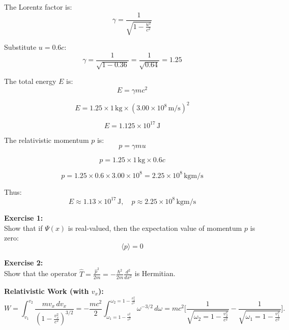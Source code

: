 \documentclass{article}
\begin{document}
\begin{multicols}{2}
\begin{minipage}{\linewidth}
The Lorentz factor is:
\[
\gamma = \frac{1}{\sqrt{1 - \frac{u^2}{c^2}}}
\]

Substitute \( u = 0.6c \):
\[
\gamma = \frac{1}{\sqrt{1 - 0.36}} = \frac{1}{\sqrt{0.64}} = 1.25
\]

The total energy \( E \) is:
\[
E = \gamma mc^2
\]

\[
E = 1.25 \times 1 \, \si{\kilogram} \times (3.00 \times 10^8 \, \si{\meter\per\second})^2
\]

\[
E = 1.125 \times 10^{17} \, \si{\joule}
\]

The relativistic momentum \( p \) is:
\[
p = \gamma mu
\]

\[
p = 1.25 \times 1 \, \si{\kilogram} \times 0.6c
\]

\[
p = 1.25 \times 0.6 \times 3.00 \times 10^8 = 2.25 \times 10^8 \, \si{\kilogram\meter\per\second}
\]

Thus:
\[
E \approx 1.13 \times 10^{17} \, \si{\joule}, \quad p \approx 2.25 \times 10^8 \, \si{\kilogram\meter\per\second}
\]

\end{minipage}

\vspace{0.2cm}

\begin{minipage}{\linewidth}
\textbf{Exercise 1:} \\[-0.2cm]
Show that if $\Psi(x)$ is real-valued, then the expectation value of momentum $p$ is zero:
\[
\langle p \rangle = 0
\]
\end{minipage}

\vspace{0.2cm}

\begin{minipage}{\linewidth}
\textbf{Exercise 2:} \\[-0.2cm]
Show that the operator $\hat{T} = \frac{\hat{p}^2}{2m} = -\frac{\hbar^2}{2m} \frac{d^2}{dx^2}$ is Hermitian.
\end{minipage}

\textbf{Relativistic Work (with $v_x$):} \\[-0.2cm]
\[
W = \int_{v_1}^{v_2} \frac{m v_x \, dv_x}{\left( 1 - \frac{v_x^2}{c^2} \right)^{3/2}} = -\frac{mc^2}{2} \int_{\omega_1 = 1 - \frac{v_1^2}{c^2}}^{\omega_2 = 1 - \frac{v_2^2}{c^2}} \omega^{-3/2} \, d\omega = mc^2 \Big[ \frac{1}{\sqrt{\omega_2 = 1 - \frac{v_2^2}{c^2}}} - \frac{1}{\sqrt{\omega_1 = 1 - \frac{v_1^2}{c^2}}} \Big].
\]

\end{multicols}
\end{document}
